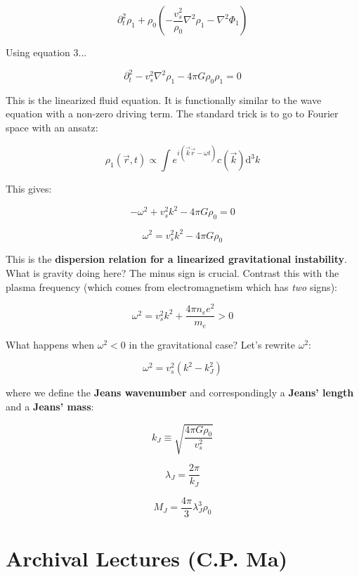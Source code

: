 \documentclass{article}
\newcommand{\be}{\begin{equation}}
\newcommand{\ee}{\end{equation}}
\begin{document}
\be
\partial_t^2 \rho_1 + \rho_0 \left(-\frac{v_s^2}{\rho_0} \nabla^2 \rho_1 - \nabla^2 \Phi_1\right)
\ee

Using equation 3...

\be
\boxed{\partial^2_t  - v_s^2 \nabla^2 \rho_1 - 4\pi G \rho_0\rho_1 = 0}
\ee

This is the linearized fluid equation. It is functionally similar to the wave equation with a non-zero driving term. The standard trick is to go to Fourier space with an ansatz:

\be
\rho_1 (\vec{r},t) \propto \int e^{i(\vec{k}\dot\vec{r} - \omega t)} c\left(
\vec{k}\right) \mathrm{d}^3 k
\ee

This gives:

\be
-\omega^2 + v_s^2 k^2 - 4\pi G \rho_0 = 0 
\ee

\be
\boxed{\omega^2 = v_s^2 k^2 - 4\pi G \rho_0 }
\ee

This is the \textbf{dispersion relation for a linearized gravitational instability}. What is gravity doing here? The minus sign is crucial. Contrast this with the plasma frequency (which comes from electromagnetism which has \textit{two} signs):

\be
\omega^2 = v^2_s k^2 + \frac{4\pi n_e e^2}{m_e} > 0
\ee

What happens when $\omega^2 < 0$ in the gravitational case? Let's rewrite $\omega^2$:

\be
\omega^2 = v_s^2 \left(k^2 - k_J^2\right)
\ee

where we define the \textbf{Jeans wavenumber} and correspondingly a \textbf{Jeans' length} and a \textbf{Jeans' mass}:

\be
k_J \equiv \sqrt{\frac{4\pi G \rho_0}{v_s^2}}
\ee

\be
\lambda_J = \frac{2\pi}{k_J}
\ee

\be
M_J = \frac{4\pi}{3} \lambda_J^3 \rho_0
\ee


















\appendix 

\section{Archival Lectures (C.P. Ma)}
\end{document}
